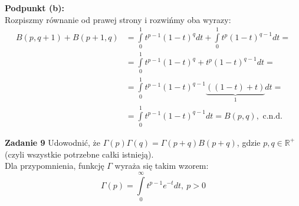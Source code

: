 \documentclass[a4paper,12pt]{article}
\newcommand{\comment}[1]{}                              %
\begin{document}
\newpage
\noindent \textbf{Podpunkt (b):} \\
Rozpiszmy równanie od prawej strony i rozwińmy oba wyrazy:
\begin{align*}
    B(p, q+1) + B(p+1, q) &= \int\limits_0^1 t^{p-1} (1-t)^{q} dt
        + \int\limits_0^1 t^{p} (1-t)^{q-1} dt = \\
    &= \int\limits_0^1 t^{p-1} (1-t)^{q} + t^{p} (1-t)^{q-1} dt = \\
    &= \int\limits_0^1 t^{p-1} (1-t)^{q-1} \underbrace{((1-t) + t)}_{1} dt = \\
    &= \int\limits_0^1 t^{p-1} (1-t)^{q-1} dt = B(p, q), \text{ c.n.d.}
\end{align*}

\noindent \newline \textbf{Zadanie 9} \newline
Udowodnić, że $\Gamma(p)\Gamma(q) = \Gamma(p+q) B(p+q)$, gdzie $p, q \in 
\mathbb{R}^+$ (czyli wszystkie potrzebne całki istnieją). \\

\noindent Dla przypomnienia, funkcję $\Gamma$ wyraża się takim wzorem:
\[
    \Gamma (p) = \int\limits_{0}^{\infty} t^{p-1}e^{-t} dt, \ p > 0    
\]

\comment{ %
    \noindent Przejdźmy więc do rozwiązania:
    \begin{align*}
        \Gamma(p)\Gamma(q) &= \left( \int\limits_0^\infty x^{p-1} e^{-x} dx \right)
            \cdot \left( \int\limits_0^\infty y^{q-1} e^{-y} dy \right) = \\
        &= \iint\limits_0^\infty x^{p-1} y^{q-1} e^{-x-y} dx dy = \\
        &= \left[ \begin{Bmatrix*}[l]
                x = rt      & t \in [0, 1] \\
                y = (1-t)r  & r \in [0, \infty) \\
                dxdy = \det(A) dtdr
            \end{Bmatrix*}, 
            \det(A) = \begin{vmatrix*}
                r   &   t \\
                -r  &   1-t
            \end{vmatrix*} = 
            \begin{vmatrix*}
                r   &   t \\
                0   &   1
            \end{vmatrix*} = r
            \right] = \\
        &= \int\limits_0^\infty \int\limits_0^1
                r^{p-1} t^{p-1} (1-t)^{q-1} r^{q-1} e^{-r} r dt dr =
            \int\limits_0^\infty \int\limits_0^1
                r^{p+q-1} e^{-r} t^{p-1} (1-t)^{q-1} dt dr = \\
        &= \left( \int\limits_0^\infty r^{p+q-1} e^{-r} dr \right) \cdot
            \left( \int\limits_0^1 t^{p-1} (1-t)^{q-1} dt \right) =
            \Gamma(p+q) \cdot B(p, q), \text{ c.n.d.}
    \end{align*}
}
\end{document}
